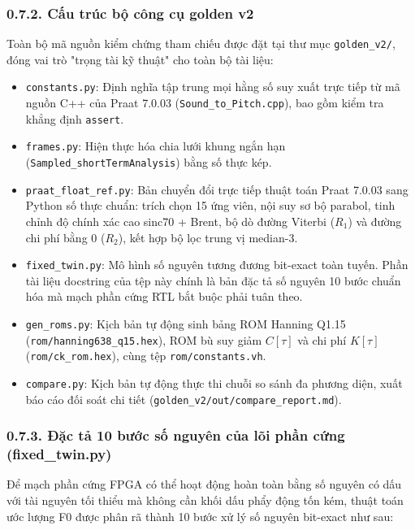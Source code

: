 \subsubsection*{0.7.2. Cấu trúc bộ công cụ golden v2}
Toàn bộ mã nguồn kiểm chứng tham chiếu được đặt tại thư mục \texttt{golden\_v2/}, đóng vai trò "trọng tài kỹ thuật" cho toàn bộ tài liệu:
\begin{itemize}[leftmargin=1.5em, itemsep=2pt]
    \item \texttt{constants.py}: Định nghĩa tập trung mọi hằng số suy xuất trực tiếp từ mã nguồn C++ của Praat 7.0.03 (\texttt{Sound\_to\_Pitch.cpp}), bao gồm kiểm tra khẳng định \texttt{assert}.
    \item \texttt{frames.py}: Hiện thực hóa chia lưới khung ngắn hạn (\texttt{Sampled\_}\allowbreak\texttt{shortTerm}\allowbreak\texttt{Analysis}) bằng số thực kép.
    \item \texttt{praat\_float\_ref.py}: Bản chuyển đổi trực tiếp thuật toán Praat 7.0.03 sang Python số thực chuẩn: trích chọn 15 ứng viên, nội suy sơ bộ parabol, tinh chỉnh độ chính xác cao sinc70 + Brent, bộ dò đường Viterbi ($R_1$) và đường chi phí bằng 0 ($R_2$), kết hợp bộ lọc trung vị median-3.
    \item \texttt{fixed\_twin.py}: Mô hình số nguyên tương đương bit-exact toàn tuyến. Phần tài liệu docstring của tệp này chính là bản đặc tả số nguyên 10 bước chuẩn hóa mà mạch phần cứng RTL bắt buộc phải tuân theo.
    \item \texttt{gen\_roms.py}: Kịch bản tự động sinh bảng ROM Hanning Q1.15 (\texttt{rom/}\allowbreak\texttt{hanning638\_q15.hex}), ROM bù suy giảm $C[\tau]$ và chi phí $K[\tau]$ (\texttt{rom/}\allowbreak\texttt{ck\_rom.hex}), cùng tệp \texttt{rom/}\allowbreak\texttt{constants.vh}.
    \item \texttt{compare.py}: Kịch bản tự động thực thi chuỗi so sánh đa phương diện, xuất báo cáo đối soát chi tiết (\texttt{golden\_v2/}\linebreak[0]\texttt{out/}\linebreak[0]\texttt{compare\_report.md}).
\end{itemize}

\subsubsection*{0.7.3. Đặc tả 10 bước số nguyên của lõi phần cứng (fixed\_twin.py)}
Để mạch phần cứng FPGA có thể hoạt động hoàn toàn bằng số nguyên có dấu với tài nguyên tối thiểu mà không cần khối dấu phẩy động tốn kém, thuật toán ước lượng F0 được phân rã thành 10 bước xử lý số nguyên bit-exact như sau:

